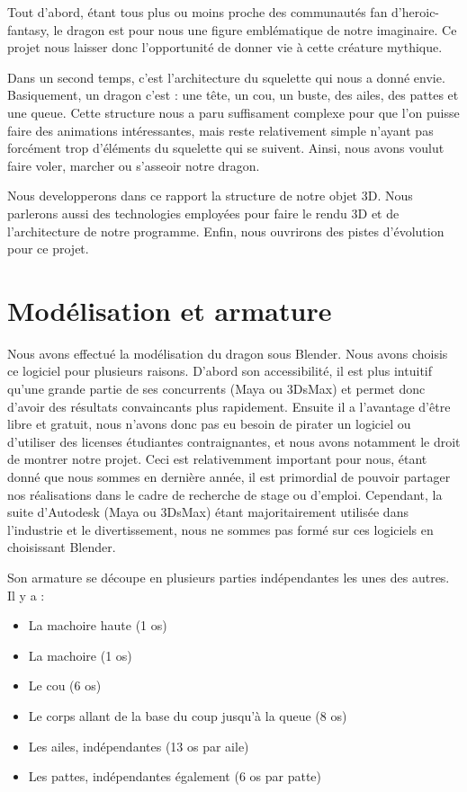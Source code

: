 \documentclass[a4paper]{report}
\begin{document}
Tout d'abord, étant tous plus ou moins proche des communautés fan d'heroic-fantasy, le dragon est pour nous une figure emblématique de notre imaginaire. Ce projet nous laisser donc l'opportunité de donner vie à cette créature mythique. 

Dans un second temps, c'est l'architecture du squelette qui nous a donné envie. Basiquement, un dragon c'est : une tête, un cou, un buste, des ailes, des pattes et une queue. Cette structure nous a paru suffisament complexe pour que l'on puisse faire des animations intéressantes, mais reste relativement simple n'ayant pas forcément trop d'éléments du squelette qui se suivent. Ainsi, nous avons voulut faire voler, marcher ou s'asseoir notre dragon.

Nous developperons dans ce rapport la structure de notre objet 3D. Nous parlerons aussi des technologies employées pour faire le rendu 3D et de l'architecture de notre programme. Enfin, nous ouvrirons des pistes d'évolution pour ce projet. 


\newpage
\chapter{Modélisation et armature}
\par
Nous avons effectué la modélisation du dragon sous Blender. Nous avons choisis ce logiciel pour plusieurs raisons. D'abord son accessibilité, il est plus intuitif qu'une grande partie de ses concurrents (Maya ou 3DsMax) et permet donc d'avoir des résultats convaincants plus rapidement. Ensuite il a l'avantage d'être libre et gratuit, nous n'avons donc pas eu besoin de pirater un logiciel ou d'utiliser des licenses étudiantes contraignantes, et nous avons notamment le droit de montrer notre projet. Ceci est relativemment important pour nous, étant donné que nous sommes en dernière année, il est primordial de pouvoir partager nos réalisations dans le cadre de recherche de stage ou d'emploi. Cependant, la suite d'Autodesk (Maya ou 3DsMax) étant majoritairement utilisée dans l'industrie et le divertissement, nous ne sommes pas formé sur ces logiciels en choisissant Blender.

Son armature se découpe en plusieurs parties indépendantes les unes des autres. Il y a :
\begin{itemize}
\item La machoire haute (1 os)
\item La machoire (1 os)
\item Le cou (6 os)
\item Le corps allant de la base du coup jusqu'à la queue (8 os)
\item Les ailes, indépendantes (13 os par aile)
\item Les pattes, indépendantes également (6 os par patte)
\end{itemize}
\end{document}
